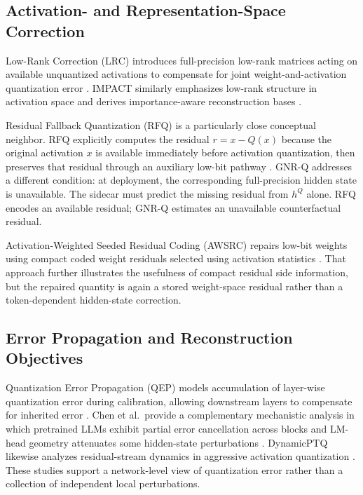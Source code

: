 \documentclass[11pt]{article}
\newcommand{\gnrq}{GNR-Q}
\begin{document}
\subsection{Activation- and Representation-Space Correction}

Low-Rank Correction (LRC) introduces full-precision low-rank matrices acting on available unquantized activations to compensate for joint weight-and-activation quantization error \cite{scetbon2024lrc}. IMPACT similarly emphasizes low-rank structure in activation space and derives importance-aware reconstruction bases \cite{chowdhury2026impact}.

Residual Fallback Quantization (RFQ) is a particularly close conceptual neighbor. RFQ explicitly computes the residual $r=x-Q(x)$ because the original activation $x$ is available immediately before activation quantization, then preserves that residual through an auxiliary low-bit pathway \cite{rahman2026rfq}. \gnrq{} addresses a different condition: at deployment, the corresponding full-precision hidden state is unavailable. The sidecar must predict the missing residual from $h^Q$ alone. RFQ encodes an available residual; \gnrq{} estimates an unavailable counterfactual residual.

Activation-Weighted Seeded Residual Coding (AWSRC) repairs low-bit weights using compact coded weight residuals selected using activation statistics \cite{liu2026awsrc}. That approach further illustrates the usefulness of compact residual side information, but the repaired quantity is again a stored weight-space residual rather than a token-dependent hidden-state correction.

\subsection{Error Propagation and Reconstruction Objectives}

Quantization Error Propagation (QEP) models accumulation of layer-wise quantization error during calibration, allowing downstream layers to compensate for inherited error \cite{arai2025qep}. Chen et al.\ provide a complementary mechanistic analysis in which pretrained LLMs exhibit partial error cancellation across blocks and LM-head geometry attenuates some hidden-state perturbations \cite{chen2026why}. DynamicPTQ likewise analyzes residual-stream dynamics in aggressive activation quantization \cite{zhao2026dynamicptq}. These studies support a network-level view of quantization error rather than a collection of independent local perturbations.
\end{document}
